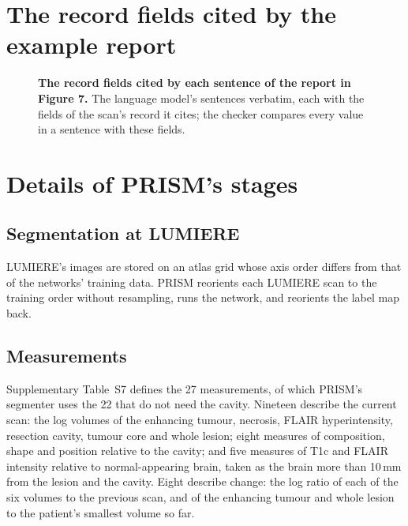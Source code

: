 \documentclass[11pt,a4paper]{article}
\begin{document}
\FloatBarrier
\section{The record fields cited by the example report}\label{sec:S28}

\begin{figure}[!htbp]
\renewcommand{\thefigure}{S2}\renewcommand{\theHfigure}{S2}
\centering
{}
\caption{\textbf{The record fields cited by each sentence of the report in Figure 7.} The language model's sentences
verbatim, each with the fields of the scan's record it cites; the checker compares every value in a sentence with
these fields.}
\label{fig:S_fields}
\end{figure}


\FloatBarrier
\section{Details of PRISM's stages}\label{sec:S29}

\subsection{Segmentation at LUMIERE}\label{sec:S29.1}

LUMIERE's images are stored on an atlas grid whose axis order differs from that of the networks' training data. PRISM
reorients each LUMIERE scan to the training order without resampling, runs the network, and reorients the label map
back.

\subsection{Measurements}\label{sec:S29.2}

Supplementary Table~S7 defines the 27 measurements, of which PRISM's segmenter uses the 22 that do not need the cavity. Nineteen describe the current scan: the log volumes of the
enhancing tumour, necrosis, FLAIR hyperintensity, resection cavity, tumour core and whole lesion; eight measures of
composition, shape and position relative to the cavity; and five measures of T1c and FLAIR intensity relative to
normal-appearing brain, taken as the brain more than 10\,mm from the lesion and the cavity. Eight describe change: the
log ratio of each of the six volumes to the previous scan, and of the enhancing tumour and whole lesion to the
patient's smallest volume so far.
\end{document}
